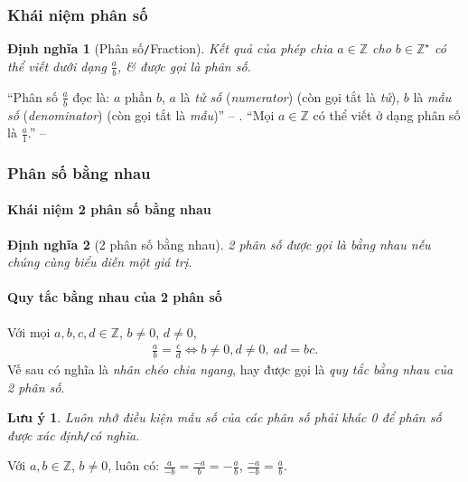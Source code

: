 \documentclass{article}
\numberwithin{equation}{section}
\newtheorem{dinhnghia}{Định nghĩa}[section]
\newtheorem{luuy}{Lưu ý}[section]
\begin{document}
\subsubsection{Khái niệm phân số}

\begin{dinhnghia}[Phân số\texttt{/}Fraction]
	Kết quả của phép chia $a\in\mathbb{Z}$ cho $b\in\mathbb{Z}^\star$ có thể viết dưới dạng $\frac{a}{b}$, \textit{\&} được gọi là \emph{phân số}.
\end{dinhnghia}
``Phân số $\frac{a}{b}$ đọc là: $a$ phần $b$, $a$ là \textit{tử số} (\textit{numerator}) (còn gọi tắt là \textit{tử}), $b$ là \textit{mẫu số} (\textit{denominator}) (còn gọi tắt là \textit{mẫu})'' -- \cite[p.  25]{SGK_Toan_6_Canh_Dieu_tap_2}. ``Mọi $a\in\mathbb{Z}$ có thể viết ở dạng phân số là $\frac{a}{1}$.'' -- \cite[p.  26]{SGK_Toan_6_Canh_Dieu_tap_2}

\subsubsection{Phân số bằng nhau}

\paragraph{Khái niệm 2 phân số bằng nhau}
\begin{dinhnghia}[2 phân số bằng nhau]
	2 phân số được gọi là \emph{bằng nhau} nếu chúng cùng biểu diễn một giá trị.
\end{dinhnghia}

\paragraph{Quy tắc bằng nhau của 2 phân số}
Với mọi $a,b,c,d\in\mathbb{Z}$, $b\ne 0$, $d\ne 0$,
\begin{align*}
	\boxed{\frac{a}{b} = \frac{c}{d}\Leftrightarrow b\ne 0, d\ne 0,\ ad = bc.}
\end{align*}
Vế sau có nghĩa là \textit{nhân chéo chia ngang}, hay được gọi là \textit{quy tắc bằng nhau của 2 phân số}.

\begin{luuy}
	Luôn nhớ điều kiện mẫu số của các phân số phải khác 0 để phân số được xác định\emph{\texttt{/}}có nghĩa.
\end{luuy}
Với $a,b\in\mathbb{Z}$, $b\ne 0$, luôn có: $\frac{a}{-b} = \frac{-a}{b} = -\frac{a}{b}$, $\frac{-a}{-b} = \frac{a}{b}$.
\end{document}
